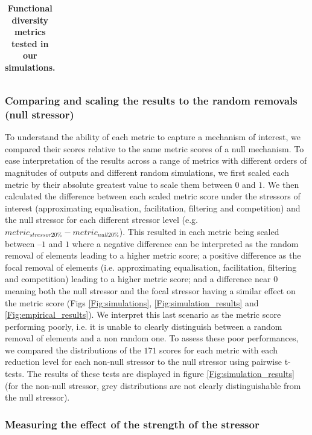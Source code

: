 \documentclass[12pt,letterpaper]{article}
\begin{document}
\begin{table}
\begin{tabular}{p{0.1\linewidth}|p{0.15\linewidth}|p{0.15\linewidth}|p{0.2\linewidth}|p{0.15\linewidth}|p{0.1\linewidth}}
\end{tabular}
\caption{\scriptsize{\textbf{Functional diversity metrics tested in our simulations.}}
}
\label{Tab:metrics}
\end{table}

\subsubsection{Comparing and scaling the results to the random removals (null stressor)}

To understand the ability of each metric to capture a mechanism of interest, we compared their scores relative to the same metric scores of a null mechanism.
To ease interpretation of the results across a range of metrics with different orders of magnitudes of outputs and different random simulations, we first scaled each metric by their absolute greatest value to scale them between $0$ and $1$.
We then calculated the difference between each scaled metric score under the stressors of interest (approximating equalisation, facilitation, filtering and competition) and the null stressor for each different stressor level (e.g. $metric_{stressor20\%} - metric_{null20\%}$).
This resulted in each metric being scaled between $–1$ and $1$ where a negative difference can be interpreted as the random removal of elements leading to a higher metric score; a positive difference as the focal removal of elements (i.e. approximating equalisation, facilitation, filtering and competition) leading to a higher metric score; and a difference near $0$ meaning both the null stressor and the focal stressor having a similar effect on the metric score (Figs \ref{Fig:simulations}, \ref{Fig:simulation_results} and \ref{Fig:empirical_results}).
We interpret this last scenario as the metric score performing poorly, i.e. it is unable to clearly distinguish between a random removal of elements and a non random one.
To assess these poor performances, we compared the distributions of the $171$ scores for each metric with each reduction level for each non-null stressor to the null stressor using pairwise t-tests.
The results of these tests are displayed in figure \ref{Fig:simulation_results} (for the non-null stressor, grey distributions are not clearly distinguishable from the null stressor).

\subsubsection{Measuring the effect of the strength of the stressor}
\end{document}
